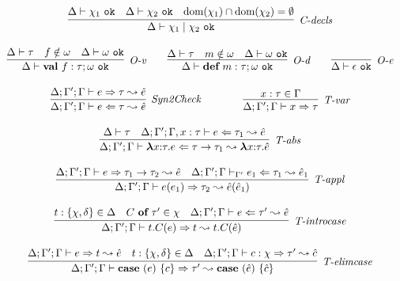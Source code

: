 \begin{figure}
\[\begin{array}{c}
\infer[\textit{C-decls}]
	{\Delta \vdash  \chi_1 \bnfalt \chi_2~\texttt{ok}} 
	{\Delta \vdash \chi_1~\texttt{ok} & \Delta \vdash \chi_2~\texttt{ok} & \text{dom}(\chi_1) \intersect \text{dom}(\chi_2) = \emptyset}\\[3ex]

\infer[\textit{O-v}]
	{\Delta \vdash \keyw{val}~ f:\tau; \omega \ \texttt{ok} }
	{\Delta \vdash \tau & f \notin \omega & \Delta \vdash \omega \ \texttt{ok} }
~~~~~~	
\infer[\textit{O-d}]
	{\Delta \vdash \keyw{def}~ m:\tau; \omega \ \texttt{ok} }
	{\Delta \vdash \tau & m \notin \omega & \Delta \vdash \omega \ \texttt{ok} }
~~~~~~
\infer[\textit{O-e}]
	{\Delta \vdash \epsilon \ \texttt{ok}}
	{ }\\[3ex]

\infer[\textit{Syn2Check}]
	{\Delta; \Gamma'; \Gamma \vdash  e \Leftarrow \tau \leadsto \hat{e}} 
	{\Delta; \Gamma'; \Gamma \vdash e \Rightarrow \tau \leadsto \hat{e}   }
~~~~~~~~~~~~
\infer[\textit{T-var}]
	{\Delta; \Gamma'; \Gamma \vdash x\Rightarrow\tau } 
	{x:\tau \in \Gamma }\\[3ex]

\infer[\textit{T-abs}]
	{\Delta; \Gamma'; \Gamma \vdash  \boldsymbol\lambda x{:}\tau . e \Leftarrow \tau \rightarrow \tau_1 \leadsto \boldsymbol\lambda x{:}\tau .\hat{e}} 
	{\Delta\vdash \tau & \Delta; \Gamma'; \Gamma, x:\tau \vdash e\Leftarrow \tau_1 \leadsto \hat{e}}\\[3ex]

\infer[\textit{T-appl}]
	{\Delta; \Gamma'; \Gamma \vdash  e(e_1) \Rightarrow \tau_2  \leadsto \hat{e}(\hat{e}_1) } 
	{\Delta; \Gamma'; \Gamma \vdash e \Rightarrow \tau_1 \rightarrow \tau_2  \leadsto \hat{e}  & \Delta; \Gamma'; \Gamma \vdash_{\Gamma'} e_1 \Leftarrow \tau_1 \leadsto \hat{e}_1 }\\[3ex]

\infer[\textit{T-introcase}]
	{\Delta; \Gamma'; \Gamma \vdash  t.C(e) \Rightarrow t  \leadsto t.C(\hat{e}) } 
	{t:\{\chi, \delta\} \in \Delta & C\ \keyw{of}\ \tau' \in \chi &\Delta; \Gamma'; \Gamma \vdash e \Leftarrow \tau'  \leadsto \hat{e}}\\[3ex]

\infer[\textit{T-elimcase}]
	{\Delta; \Gamma'; \Gamma \vdash  \keyw{case}~(e)~\{ c \} \Rightarrow \tau'  \leadsto \keyw{case}~(\hat{e})~\{ \hat{c} \} } 
	{\Delta; \Gamma'; \Gamma \vdash e \Rightarrow t  \leadsto \hat{e}  & t:\{ \chi,\delta\} \in \Delta & \Delta; \Gamma'; \Gamma \vdash c:\chi \Rightarrow \tau' \leadsto \hat{c}}\\[3ex]


\end{array}\]
\end{figure}
